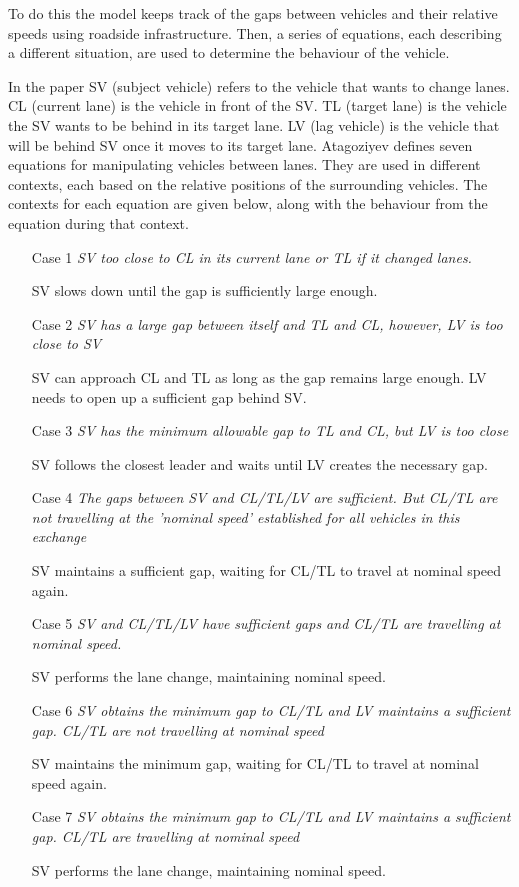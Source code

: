 To do this the model keeps track of the gaps between vehicles and their relative speeds using roadside infrastructure. Then, a series of equations, each describing a different situation, are used to determine the behaviour of the vehicle.

In the paper SV (subject vehicle) refers to the vehicle that wants to change lanes. CL (current lane) is the vehicle in front of the SV. TL (target lane) is the vehicle the SV wants to be behind in its target lane. LV (lag vehicle) is the vehicle that will be behind SV once it moves to its target  lane. Atagoziyev defines seven equations for manipulating vehicles between lanes. They are used in different contexts, each based on the relative positions of the surrounding vehicles. The contexts for each equation are given below, along with the behaviour from the equation during that context.

\begin{enumerate}
\item[Case 1] \textit{SV too close to CL in its current lane or TL if it changed lanes.}

SV slows down until the gap is sufficiently large enough.
\item[Case 2] \textit{SV has a large gap between itself and TL and CL, however, LV is too close to SV}

SV can approach CL and TL as long as the gap remains large enough. LV needs to open up a sufficient gap behind SV.
\item[Case 3] \textit{SV has the minimum allowable gap to TL and CL, but LV is too close}

SV follows the closest leader and waits until LV creates the necessary gap.
\item[Case 4] \textit{The gaps between SV and CL/TL/LV are sufficient. But CL/TL are not travelling at the 'nominal speed' established for all vehicles in this exchange}

SV maintains a sufficient gap, waiting for CL/TL to travel at nominal speed again.
\item[Case 5] \textit{SV and CL/TL/LV have sufficient gaps and CL/TL are travelling at nominal speed.}

SV performs the lane change, maintaining nominal speed.
\item[Case 6] \textit{SV obtains the minimum gap to CL/TL and LV maintains a sufficient gap. CL/TL are not travelling at nominal speed}

SV maintains the minimum gap, waiting for CL/TL to travel at nominal speed again.
\item[Case 7] \textit{SV obtains the minimum gap to CL/TL and LV maintains a sufficient gap. CL/TL are travelling at nominal speed}

SV performs the lane change, maintaining nominal speed.
\end{enumerate}

